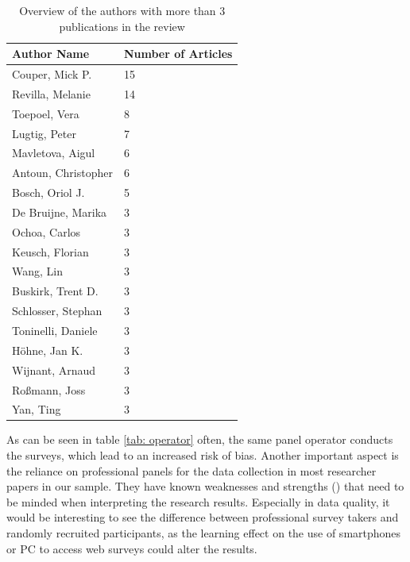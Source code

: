 \begin{table}
	\centering
	\begin{tabular}{ll}
		\toprule
		Author Name & Number of Articles \\
		\midrule
		Couper, Mick P. &        15 \\
        Revilla, Melanie &      14\\
        Toepoel, Vera  &         8\\
        Lugtig, Peter   &        7\\
        Mavletova, Aigul    &    6\\
        Antoun, Christopher  &   6\\
        Bosch, Oriol J.   &      5\\
        De Bruijne, Marika  &    3\\
        Ochoa, Carlos      &     3\\
        Keusch, Florian     &    3\\
        Wang, Lin           &    3\\
        Buskirk, Trent D.     &  3\\
        Schlosser, Stephan  &   3\\
        Toninelli, Daniele   &   3\\
        Höhne, Jan K.        &   3\\
        Wijnant, Arnaud      &   3\\
        Roßmann, Joss       &    3\\
        Yan, Ting            &   3\\
		\bottomrule 
	\end{tabular}
	\caption{Overview of the authors with more than 3 publications in the review}
	\label{tab: authors}
\end{table}

As can be seen in table \ref{tab: operator} often, the same panel operator conducts the surveys, which lead to an increased risk of bias. Another important aspect is the reliance on professional panels for the data collection in most researcher papers in our sample. They have known weaknesses and strengths (\cite{callegaro_online_2014, kees_analysis_2017}) that need to be minded when interpreting the research results. Especially in data quality, it would be interesting to see the difference between professional survey takers and randomly recruited participants, as the learning effect on the use of smartphones or PC to access web surveys could alter the results.



